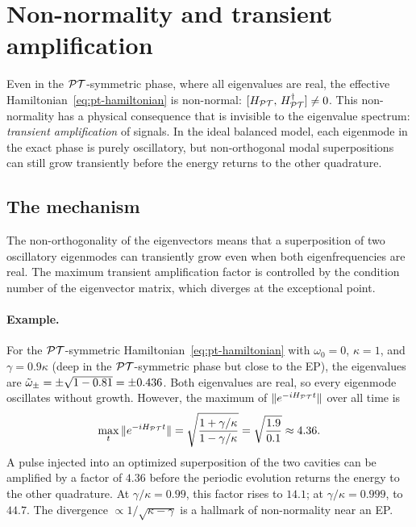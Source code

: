 \section{Non-normality and transient amplification}
\label{sec:pt-nonnormality}

Even in the $\mathcal{PT}$-symmetric phase, where all eigenvalues are real, the
effective Hamiltonian~\eqref{eq:pt-hamiltonian} is non-normal:
$[H_{\mathcal{PT}},\,H_{\mathcal{PT}}^\dagger] \neq 0$. This non-normality has a
physical consequence that is invisible to the eigenvalue spectrum:
\emph{transient amplification} of signals. In the ideal balanced model,
each eigenmode in the exact phase is purely oscillatory, but
non-orthogonal modal superpositions can still grow transiently before
the energy returns to the other quadrature.

\subsection{The mechanism}
\label{ssec:transient-mechanism}

The non-orthogonality of the eigenvectors means that a superposition of
two oscillatory eigenmodes can transiently grow even when both
eigenfrequencies are real. The maximum transient amplification factor is
controlled by the condition number of the eigenvector matrix, which
diverges at the exceptional point.

\paragraph{Example.}
For the $\mathcal{PT}$-symmetric Hamiltonian~\eqref{eq:pt-hamiltonian} with
$\omega_0 = 0$, $\kappa = 1$, and $\gamma = 0.9\kappa$ (deep in the
$\mathcal{PT}$-symmetric phase but close to the EP), the eigenvalues are
$\tilde{\omega}_\pm = \pm\sqrt{1 - 0.81} = \pm 0.436$. Both eigenvalues are
real, so every eigenmode oscillates without growth. However, the
maximum of $\|e^{-iH_{\mathcal{PT}}t}\|$ over all time is
\begin{equation}
 \max_t \|e^{-iH_{\mathcal{PT}}t}\|
 = \sqrt{\frac{1+\gamma/\kappa}{1-\gamma/\kappa}}
 = \sqrt{\frac{1.9}{0.1}} \approx 4.36.
 \label{eq:transient-max}
\end{equation}
A pulse injected into an optimized superposition of the two cavities can
be amplified by a factor of $4.36$ before the periodic evolution returns
the energy to the other quadrature. At $\gamma/\kappa = 0.99$, this
factor rises to $14.1$; at $\gamma/\kappa = 0.999$, to $44.7$. The
divergence $\propto 1/\sqrt{\kappa - \gamma}$ is a hallmark of
non-normality near an EP.

